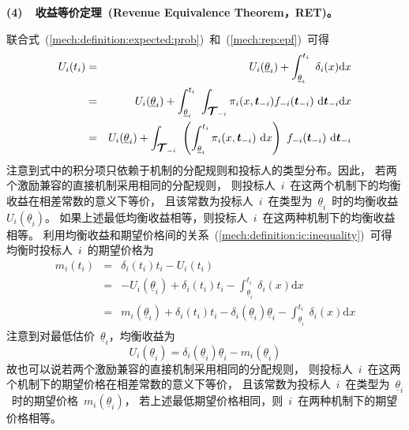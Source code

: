 \documentclass[a4paper,12pt]{article}
\newcommand{\mv}[1]{\mbox{\boldmath$#1$}}         %
\newcommand{\id}{\mathrm{d}}                      %
\begin{document}
\textbf{(4)~~收益等价定理~(Revenue Equivalence
Theorem，RET)。}\vspace{5pt}

联合式~(\ref{mech:definition:expected:prob})~和~(\ref{mech:rep:epf})~可得
\begin{eqnarray}
\nonumber
  U_i(t_i) &=& U_i(\underline{\theta}_i) + \int_{\underline{\theta}_i}^{t_i}~\delta_i(x)\id x \\
\nonumber
   &=& U_i(\underline{\theta}_i) + \int_{\underline{\theta}_i}^{t_i}~
       \int_{\mv{\mathcal{T}}_{-i}}\pi_i(x,\mv{t}_{-i})f_{-i}(\mv{t}_{-i})~\id\mv{t}_{-i} \id x\\
   &=& U_i(\underline{\theta}_i) + \int_{\mv{\mathcal{T}}_{-i}}~
       \left(\int_{\underline{\theta}_i}^{t_i}\pi_i(x,\mv{t}_{-i})~\id x\right)~f_{-i}(\mv{t}_{-i})~\id\mv{t}_{-i}
\label{mech:ret:epf}
\end{eqnarray}
注意到式中的积分项只依赖于机制的分配规则和投标人的类型分布。因此，
若两个激励兼容的直接机制采用相同的分配规则，
则投标人~$i$~在这两个机制下的均衡收益在相差常数的意义下等价，
且该常数为投标人~$i$~在类型为~$\underline{\theta}_i$~时的均衡收益~$U_i(\underline{\theta}_i)$。
如果上述最低均衡收益相等，则投标人~$i$~在这两种机制下的均衡收益相等。
利用均衡收益和期望价格间的关系~(\ref{mech:definition:ic:inequality})~可得
均衡时投标人~$i$~的期望价格为
\begin{eqnarray*}
  m_i(t_i) &=& \delta_i(t_i)t_i - U_i(t_i) \\
   &=& -U_i(\underline{\theta}_i) + \delta_i(t_i)t_i - \int_{\underline{\theta}_i}^{t_i}~\delta_i(x)\id x \\
   &=& m_i(\underline{\theta}_i) + \delta_i(t_i)t_i - \delta_i(\underline{\theta}_i)\underline{\theta}_i
    - \int_{\underline{\theta}_i}^{t_i}~\delta_i(x)\id x
\end{eqnarray*}
注意到对最低估价~$\underline{\theta}_i$，均衡收益为
\begin{equation*}
    U_i(\underline{\theta}_i) = \delta_i(\underline{\theta}_i)\underline{\theta}_i - m_i(\underline{\theta}_i)
\end{equation*}
故也可以说若两个激励兼容的直接机制采用相同的分配规则，
则投标人~$i$~在这两个机制下的期望价格在相差常数的意义下等价，
且该常数为投标人~$i$~在类型为~$\underline{\theta}_i$~时的期望价格~$m_i(\underline{\theta}_i)$，
若上述最低期望价格相同，则~$i$~在两种机制下的期望价格相等。
\end{document}
